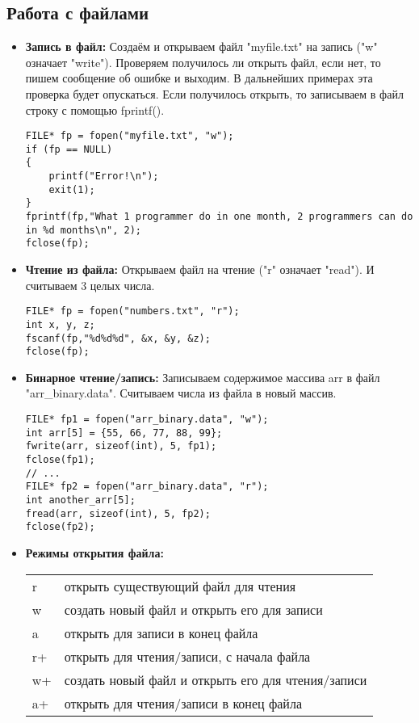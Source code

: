 \documentclass{article}
\begin{document}
\subsection*{Работа с файлами}
\begin{itemize}
\item \textbf{Запись в файл:} Создаём и открываем файл "myfile.txt" на запись ("w" означает "write"). Проверяем получилось ли открыть файл, если нет, то пишем сообщение об ошибке и выходим.  В дальнейших примерах эта проверка будет опускаться. Если получилось открыть, то записываем в файл строку с помощью fprintf().
\begin{lstlisting}
FILE* fp = fopen("myfile.txt", "w");
if (fp == NULL)
{
    printf("Error!\n");
    exit(1);
}
fprintf(fp,"What 1 programmer do in one month, 2 programmers can do in %d months\n", 2);
fclose(fp);
\end{lstlisting}
\item \textbf{Чтение из файла:} Открываем файл на чтение ("r" означает "read"). И считываем 3 целых числа.
\begin{lstlisting}
FILE* fp = fopen("numbers.txt", "r");
int x, y, z;
fscanf(fp,"%d%d%d", &x, &y, &z);
fclose(fp);
\end{lstlisting}
\item \textbf{Бинарное чтение/запись:} Записываем содержимое массива arr в файл "arr\_binary.data". Считываем числа из файла в новый массив.
\begin{lstlisting}
FILE* fp1 = fopen("arr_binary.data", "w");
int arr[5] = {55, 66, 77, 88, 99};
fwrite(arr, sizeof(int), 5, fp1);
fclose(fp1);
// ...
FILE* fp2 = fopen("arr_binary.data", "r");
int another_arr[5];
fread(arr, sizeof(int), 5, fp2);
fclose(fp2);
\end{lstlisting}
\item \textbf{Режимы открытия файла:} \\
\begin{tabular}{ | l || l |}
\hline
  r & открыть существующий файл для чтения \\
  w & создать новый файл и открыть его для записи \\
  a & открыть для записи в конец файла \\
  r+ & открыть для чтения/записи, с начала файла  \\
  w+ & создать новый файл и открыть его для чтения/записи \\
  a+ & открыть для чтения/записи в конец файла \\
\hline
\end{tabular}\\
\end{itemize}
\end{document}
